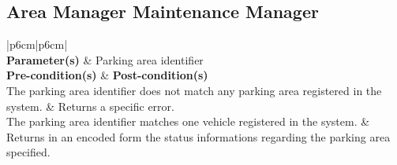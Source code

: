 \subsection{Area Manager \textrightarrow{} Maintenance Manager}

\begin{minipage}{\textwidth}
\begin{longtable}{ |p{6cm}|p{6cm}| }
	\hline
	 \\
	\hline
	\textbf{Parameter(s)} & Parking area identifier \\
	\hline
	\textbf{Pre-condition(s)} & \textbf{Post-condition(s)} \\
	\hline
	The parking area identifier does not match any parking area registered in the
	system.
	&
	Returns a specific error.\\
	\hline
	The parking area identifier matches one vehicle registered in the system.
	&
	Returns in an encoded form the status informations regarding the parking area
	specified. \\
	\hline
\end{longtable}
\end{minipage}
